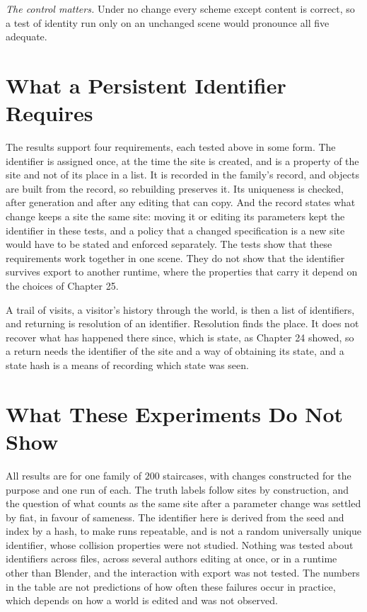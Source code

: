 \emph{The control matters.} Under no change every scheme except content is correct, so a test of identity run only on an unchanged scene would pronounce all five adequate.

\section{What a Persistent Identifier Requires}

The results support four requirements, each tested above in some form. The identifier is assigned once, at the time the site is created, and is a property of the site and not of its place in a list. It is recorded in the family's record, and objects are built from the record, so rebuilding preserves it. Its uniqueness is checked, after generation and after any editing that can copy. And the record states what change keeps a site the same site: moving it or editing its parameters kept the identifier in these tests, and a policy that a changed specification is a new site would have to be stated and enforced separately. The tests show that these requirements work together in one scene. They do not show that the identifier survives export to another runtime, where the properties that carry it depend on the choices of Chapter 25.

A trail of visits, a visitor's history through the world, is then a list of identifiers, and returning is resolution of an identifier. Resolution finds the place. It does not recover what has happened there since, which is state, as Chapter 24 showed, so a return needs the identifier of the site and a way of obtaining its state, and a state hash is a means of recording which state was seen.

\section{What These Experiments Do Not Show}

All results are for one family of $200$ staircases, with changes constructed for the purpose and one run of each. The truth labels follow sites by construction, and the question of what counts as the same site after a parameter change was settled by fiat, in favour of sameness. The identifier here is derived from the seed and index by a hash, to make runs repeatable, and is not a random universally unique identifier, whose collision properties were not studied. Nothing was tested about identifiers across files, across several authors editing at once, or in a runtime other than Blender, and the interaction with export was not tested. The numbers in the table are not predictions of how often these failures occur in practice, which depends on how a world is edited and was not observed.

